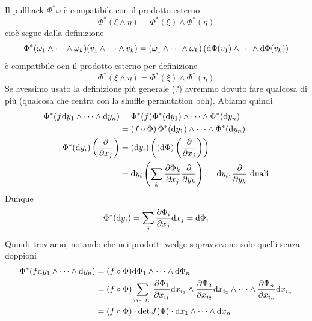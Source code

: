 \documentclass[a4paper]{article}
\begin{document}
\begin{snippetproof}{}
    Il pullback \(\Phi^* \omega\) è compatibile
    con il prodotto esterno \[
        \Phi^*(\xi \wedge \eta) = \Phi^*(\xi)
        \wedge \Phi^*(\eta)
    \]
    cioè segue dalla definizione
    \[
        \Phi^*(\omega_1 \wedge \cdots \wedge \omega_k)(v_1 \wedge \cdots \wedge v_k)
        = (\omega_1 \wedge \cdots \wedge \omega_k)
        \left(
            \text d\Phi(v_1) \wedge \cdots \wedge \text d\Phi(v_k)
        \right)
    \]
    è compatibile ocn il prodotto esterno per definizione
    \[
        \Phi^*(\xi \wedge \eta)
        = \Phi^*(\xi) \wedge \Phi^*(\eta)
    \]
    Se avessimo usato la definizione più generale (?)
    avremmo dovuto fare qualcosa di più (qualcosa che centra con la shuffle permutation boh).
    Abiamo quindi
    \begin{align*}
        \Phi^*(f \text dy_1 \wedge \cdots \wedge \text dy_n)
        &= \Phi^*(f) \Phi^*(\text dy_1) \wedge \cdots \wedge \Phi^*(\text dy_n) \\
        &= \left(f \circ \Phi\right)
        \Phi^*(\text dy_1) \wedge \cdots \wedge \Phi^*(\text dy_n) \\
        \Phi^*(\text dy_i)\left(\frac{\partial}{\partial x_j}\right)
        &= \left(\text dy_i\right)\left((\text d\Phi)\left(\frac{\partial}{\partial x_j}\right)\right) \\
        &= \text dy_i \left(
            \sum_k \frac{\partial \Phi_k}{\partial x_j} \frac{\partial}{\partial y_k}
        \right),\quad \text dy_i, \frac{\partial}{\partial y_k} \text{ duali} \\
    \end{align*}
    Dunque \[
        \Phi^*(\text dy_i) = \sum_j \frac{\partial \Phi_i}{\partial x_j} \text dx_j = \text d\Phi_i
    \]
    Quindi troviamo, notando che nei prodotti wedge sopravvivono solo quelli senza doppioni
    \begin{align*}
        \Phi^*(f \text dy_1 \wedge \cdots \wedge \text dy_n)
        &= (f \circ \Phi) \text d\Phi_1 \wedge \cdots \wedge \text d\Phi_n \\
        &= (f \circ \Phi) \sum_{i_1 \cdots i_n} \frac{\partial \Phi_1}{\partial x_{i_1}} \text dx_{i_1}
        \wedge \frac{\partial \Phi_2}{\partial x_{i_2}} \text dx_{i_2} \wedge \cdots \wedge
        \frac{\partial \Phi_n}{\partial x_{i_n}}\text dx_{i_n} \\
        &= (f \circ \Phi) \cdot \det J(\Phi) \cdot \text dx_1 \wedge \cdots \wedge \text dx_n
    \end{align*}
\end{snippetproof}
\end{document}
